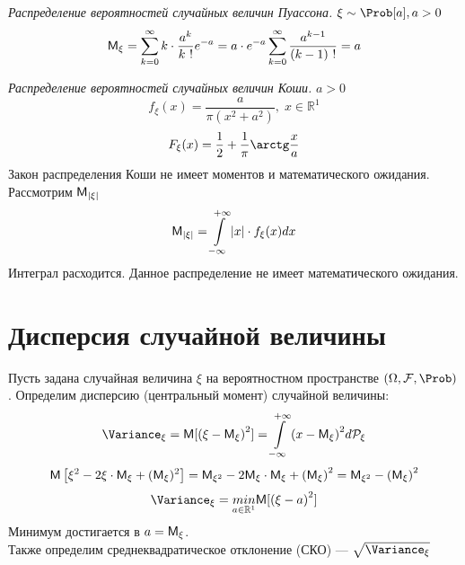 \begin{example} \textit{Распределение вероятностей случайных величин Пуассона.} $\xi \sim \Prob [a], a > 0$
  \[
    \mathsf{M}_{\xi} = \sum\limits_{k = 0}^{\infty} k \cdot \frac{a^k}{k \ !} e^{-a} = a \cdot e^{-a} \sum\limits_{k = 0}^{\infty} \frac{a^{k-1}}{(k-1) \ !} = a
  \]
\end{example}
\begin{example} \textit{Распределение вероятностей случайных величин Коши.}
  $a > 0$
  \[
    f_{\xi} (x) = \frac{a}{\pi (x^2 + a^2)},\; x \in \mathbb{R}^1
  \]
  \[
    F_{\xi} (x) = \frac{1}{2} + \frac{1}{\pi} \arctg \frac{x}{a}
  \]
  Закон распределения Коши не имеет моментов и математического ожидания. Рассмотрим $\mathsf{M}_{|\xi|}$
  \[
    \mathsf{M}_{|\xi|} = \int\limits_{-\infty}^{+\infty} |x| \cdot f_{\xi} (x) dx
  \]
  Интеграл расходится. Данное распределение не имеет математического ожидания.
\end{example}

\setcounter{equation}{0}
\section{Дисперсия случайной величины}
Пусть задана случайная величина $\xi$ на вероятностном пространстве $(\Omega, \mathcal{F}, \Prob)$. Определим дисперсию (центральный момент) случайной величины:
\[
  \Variance_{\xi} = \MExpect [ {(\xi - \MExpect_{\xi})}^2] = \int\limits_{-\infty}^{+\infty} {(x - \MExpect_{\xi})}^2 d \mathcal{P}_{\xi}
\]
\[
  \mathsf{M} \left[ \xi^2 - 2 \xi \cdot \mathsf{M}_{\xi} + (\mathsf{M}_{\xi})^2 \right] = \mathsf{M}_{\xi^2} - 2 \mathsf{M}_{\xi} \cdot \mathsf{M}_{\xi} + {(\mathsf{M}_{\xi})}^2 = \mathsf{M}_{\xi^2} - {(\mathsf{M}_{\xi})}^2
\]
\[
  \Variance_{\xi} = \underset{a \in \mathbb{R}^1}{min} \MExpect [{(\xi - a)}^2]
\]
Минимум достигается в $a = \mathsf{M}_{\xi}$. \\
Также определим среднеквадратическое отклонение (СКО) --- $\sqrt{\Variance_{\xi}}$
